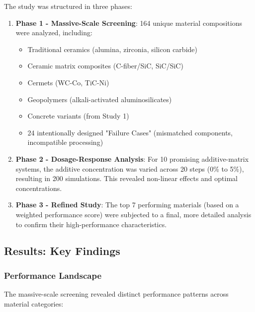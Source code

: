 \documentclass[11pt,a4paper]{article}
\begin{document}
The study was structured in three phases:

\begin{enumerate}
    \item \textbf{Phase 1 - Massive-Scale Screening}: 164 unique material compositions were analyzed, including:
    \begin{itemize}
        \item Traditional ceramics (alumina, zirconia, silicon carbide)
        \item Ceramic matrix composites (C-fiber/SiC, SiC/SiC)
        \item Cermets (WC-Co, TiC-Ni)
        \item Geopolymers (alkali-activated aluminosilicates)
        \item Concrete variants (from Study 1)
        \item 24 intentionally designed "Failure Cases" (mismatched components, incompatible processing)
    \end{itemize}
    
    \item \textbf{Phase 2 - Dosage-Response Analysis}: For 10 promising additive-matrix systems, the additive concentration was varied across 20 steps (0\% to 5\%), resulting in 200 simulations. This revealed non-linear effects and optimal concentrations.
    
    \item \textbf{Phase 3 - Refined Study}: The top 7 performing materials (based on a weighted performance score) were subjected to a final, more detailed analysis to confirm their high-performance characteristics.
\end{enumerate}

\subsection{Results: Key Findings}

\subsubsection{Performance Landscape}

The massive-scale screening revealed distinct performance patterns across material categories:
\end{document}
